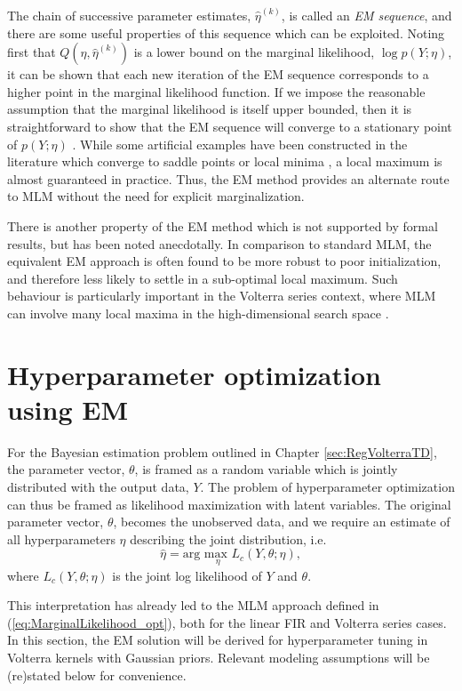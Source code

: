 The chain of successive parameter estimates, $\hat{\eta}^{(k)}$, is called an \emph{EM sequence}, and there are some useful properties of this sequence which can be exploited. Noting first that $Q(\eta,\hat{\eta}^{(k)})$ is a lower bound on the marginal likelihood, $\log p(Y; \eta)$, it can be shown that each new iteration of the EM sequence corresponds to a higher point in the marginal likelihood function. If we impose the reasonable assumption that the marginal likelihood is itself upper bounded, then it is straightforward to show that the EM sequence will converge to a stationary point of $p(Y; \eta)$ \cite{Wu1983}. While some artificial examples have been constructed in the literature which converge to saddle points or local minima \cite{McLachlan2007}, a local maximum is almost guaranteed in practice. Thus, the EM method provides an alternate route to MLM without the need for explicit marginalization.

There is another property of the EM method which is not supported by formal results, but has been noted anecdotally. In comparison to standard MLM, the equivalent EM approach is often found to be more robust to poor initialization, and therefore less likely to settle in a sub-optimal local maximum. Such behaviour is particularly important in the Volterra series context, where MLM can involve many local maxima in the high-dimensional search space \cite{Birpoutsoukis2017}.

\section{Hyperparameter optimization using EM}

For the Bayesian estimation problem outlined in Chapter \ref{sec:RegVolterraTD}, the parameter vector, $\theta$, is framed as a random variable which is jointly distributed with the output data, $Y$. The problem of hyperparameter optimization can thus be framed as likelihood maximization with latent variables. The original parameter vector, $\theta$, becomes the unobserved data, and we require an estimate of all hyperparameters $\eta$ describing the joint distribution, i.e. 
\begin{equation}
\hat{\eta} = \text{arg } \underset{\eta}{\text{max }} L_c(Y,\theta;\eta),
\end{equation}
where $ L_c(Y,\theta;\eta)$ is the joint log likelihood of $Y$ and $\theta$.

This interpretation has already led to the MLM approach defined in (\ref{eq:MarginalLikelihood_opt}), both for the linear FIR and Volterra series cases. In this section, the EM solution will be derived for hyperparameter tuning in Volterra kernels with Gaussian priors. Relevant modeling assumptions will be (re)stated below for convenience.

